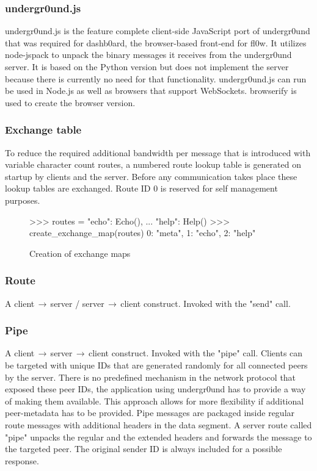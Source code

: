 \documentclass[conference]{IEEEtran}
\begin{document}
\subsubsection{undergr0und.js}
undergr0und.js is the feature complete client-side JavaScript port of undergr0und that was required for dashb0ard, the browser-based front-end for fl0w. It utilizes node-jspack to unpack the binary messages it receives from the undergr0und server. It is based on the Python version but does not implement the server because there is currently no need for that functionality. undergr0und.js can run be used in Node.js\cite{Node.js:Node.js Foundation} as well as browsers that support WebSockets\cite{The WebSocket Protocol:A. Melnikov}. browserify\cite{browserify:James Halliday} is used to create the browser version.\\

\subsubsection{Exchange table}
To reduce the required additional bandwidth per message that is introduced with variable character count routes, a numbered route lookup table is generated on startup by clients and the server. Before any communication takes place these lookup tables are exchanged. Route ID 0 is reserved for self management purposes.\\

\begin{figure}[H]
\centering
\begin{python}
>>> routes = {"echo": Echo(),
...    "help": Help()}
>>> create_exchange_map(routes)
{0: "meta", 1: "echo", 2: "help"}
\end{python}
\caption{Creation of exchange maps}
\end{figure}

\subsubsection{Route}
A client$\,\to\,$server / server$\,\to\,$client construct. Invoked with the {\color{deepgreen}"send"} call. \newpage

\subsubsection{Pipe}
A client$\,\to\,$server$\,\to\,$client construct. Invoked with the {\color{deepgreen}"pipe"} call. Clients can be targeted with unique IDs that are generated randomly for all connected peers by the server. There is no predefined mechanism in the network protocol that exposed these peer IDs, the application using undergr0und\cite{undergr0und:Philip Trauner} has to provide a way of making them available. This approach allows for more flexibility if additional peer-metadata has to be provided. Pipe messages are packaged inside regular route messages with additional headers in the data segment. A server route called {\color{deepgreen}"pipe"} unpacks the regular and the extended headers and forwards the message to the targeted peer. The original sender ID is always included for a possible response.\\
\end{document}
